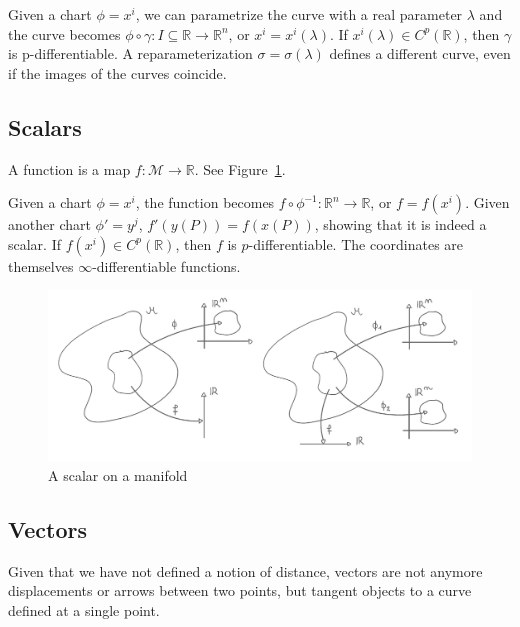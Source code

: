     \noindent Given a chart $\phi = x^i$, we can parametrize the curve with a real parameter $\lambda$ and the curve becomes $\phi \circ \gamma \colon I \subseteq \mathbb R \rightarrow \mathbb R^n$, or $x^i = x^i(\lambda)$. If $x^i(\lambda) \in C^p(\mathbb R)$, then $\gamma$ is p-differentiable. A reparameterization $\sigma = \sigma(\lambda)$ defines a different curve, even if the images of the curves coincide.

\subsection{Scalars}

    \begin{definition}
        A function is a map $f \colon \mathcal M \rightarrow \mathbb R$. See Figure~\ref{fig:scalar}.
    \end{definition} 
    \noindent Given a chart $\phi = x^i$, the function becomes $f \circ \phi^{-1} \colon \mathbb R^n \rightarrow \mathbb R$, or $f = f(x^i)$. Given another chart $\phi' = y^j$, $f'(y(P)) = f(x(P))$, showing that it is indeed a scalar. If $f(x^i) \in C^p(\mathbb R)$, then $f$ is $p$-differentiable. The coordinates are themselves $\infty$-differentiable functions.

    \begin{figure}[h!]
        \centering
        \includegraphics{scalar.pdf}
        \caption{A scalar on a manifold}\label{fig:scalar}
    \end{figure}

\subsection{Vectors}

    Given that we have not defined a notion of distance, vectors are not anymore displacements or arrows between two points, but tangent objects to a curve defined at a single point.

